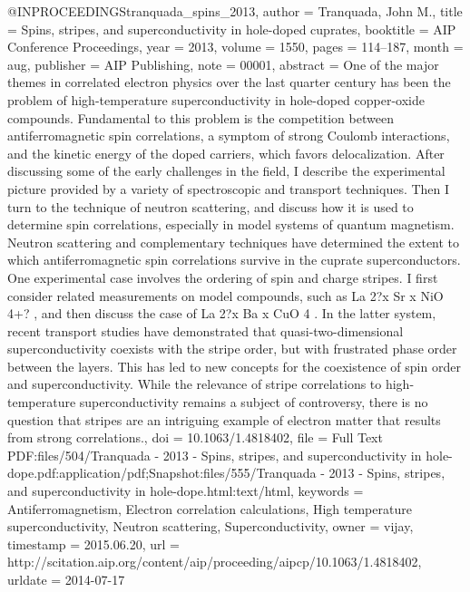 @INPROCEEDINGS{tranquada_spins_2013,
  author = {Tranquada, John M.},
  title = {Spins, stripes, and superconductivity in hole-doped cuprates},
  booktitle = {{AIP} {Conference} {Proceedings}},
  year = {2013},
  volume = {1550},
  pages = {114--187},
  month = aug,
  publisher = {AIP Publishing},
  note = {00001},
  abstract = {One of the major themes in correlated electron physics over the last
	quarter century has been the problem of high-temperature superconductivity
	in hole-doped copper-oxide compounds. Fundamental to this problem
	is the competition between antiferromagnetic spin correlations, a
	symptom of strong Coulomb interactions, and the kinetic energy of
	the doped carriers, which favors delocalization. After discussing
	some of the early challenges in the field, I describe the experimental
	picture provided by a variety of spectroscopic and transport techniques.
	Then I turn to the technique of neutron scattering, and discuss how
	it is used to determine spin correlations, especially in model systems
	of quantum magnetism. Neutron scattering and complementary techniques
	have determined the extent to which antiferromagnetic spin correlations
	survive in the cuprate superconductors. One experimental case involves
	the ordering of spin and charge stripes. I first consider related
	measurements on model compounds, such as La 2?x Sr x NiO 4+? , and
	then discuss the case of La 2?x Ba x CuO 4 . In the latter system,
	recent transport studies have demonstrated that quasi-two-dimensional
	superconductivity coexists with the stripe order, but with frustrated
	phase order between the layers. This has led to new concepts for
	the coexistence of spin order and superconductivity. While the relevance
	of stripe correlations to high-temperature superconductivity remains
	a subject of controversy, there is no question that stripes are an
	intriguing example of electron matter that results from strong correlations.},
  doi = {10.1063/1.4818402},
  file = {Full Text PDF:files/504/Tranquada - 2013 - Spins, stripes, and superconductivity in hole-dope.pdf:application/pdf;Snapshot:files/555/Tranquada - 2013 - Spins, stripes, and superconductivity in hole-dope.html:text/html},
  keywords = {Antiferromagnetism, Electron correlation calculations, High temperature
	superconductivity, Neutron scattering, Superconductivity},
  owner = {vijay},
  timestamp = {2015.06.20},
  url = {http://scitation.aip.org/content/aip/proceeding/aipcp/10.1063/1.4818402},
  urldate = {2014-07-17}
}

